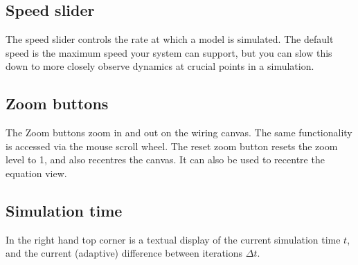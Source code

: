 %
%
%
%
%
%
%

\subsection{Speed slider}
\label{Speedslider}

\begin{center}
\end{center}

The speed slider controls the rate at which a model is simulated. The
default speed is the maximum speed your system can support, but you
can slow this down to more closely observe dynamics at crucial points
in a simulation.

\subsection{Zoom buttons}
\label{ZoomButtons}

\begin{center}
\end{center}

The Zoom buttons zoom in and out on the wiring canvas. The same functionality
is accessed via the mouse scroll wheel. The reset zoom button
 resets the zoom level to 1, and also
recentres the canvas. It can also be used to recentre the equation view.

\subsection{Simulation time}
\label{SimTime}

In the right hand top corner is a textual display of the current
simulation time $t$, and the current (adaptive) difference between
iterations $\Delta t$.

